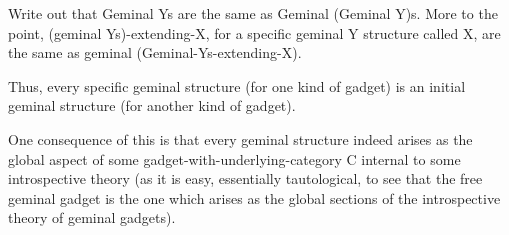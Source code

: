 \begin{TODOblock}
Write out that Geminal Ys are the same as Geminal (Geminal Y)s. More to the point, (geminal Ys)-extending-X, for a specific geminal Y structure called X, are the same as geminal (Geminal-Ys-extending-X).

Thus, every specific geminal structure (for one kind of gadget) is an initial geminal structure (for another kind of gadget).

One consequence of this is that every geminal structure indeed arises as the global aspect of some gadget-with-underlying-category C internal to some introspective theory (as it is easy, essentially tautological, to see that the free geminal gadget is the one which arises as the global sections of the introspective theory of geminal gadgets).
\end{TODOblock}